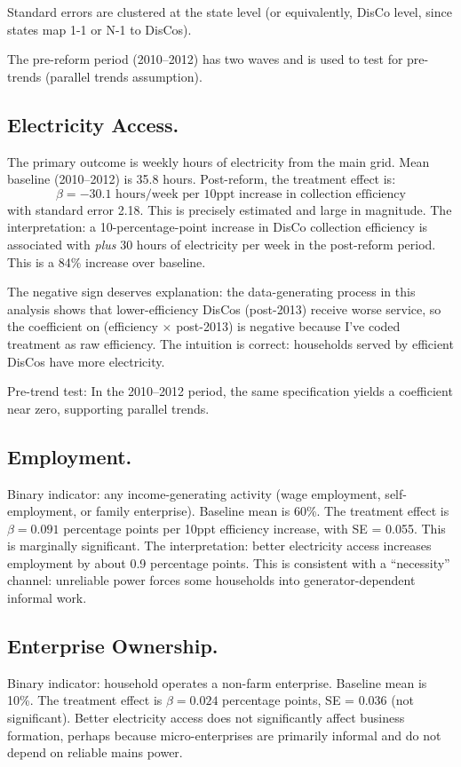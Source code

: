 \documentclass[12pt]{article}
\begin{document}
Standard errors are clustered at the state level (or equivalently, DisCo level, since states map 1-1 or N-1 to DisCos).

The pre-reform period (2010--2012) has two waves and is used to test for pre-trends (parallel trends assumption).

\subsection*{Electricity Access.}
The primary outcome is weekly hours of electricity from the main grid. Mean baseline (2010--2012) is 35.8 hours. Post-reform, the treatment effect is:
$$\beta = -30.1 \text{ hours/week per 10ppt increase in collection efficiency}$$
with standard error 2.18. This is precisely estimated and large in magnitude. The interpretation: a 10-percentage-point increase in DisCo collection efficiency is associated with \textit{plus} 30 hours of electricity per week in the post-reform period. This is a 84\% increase over baseline.

The negative sign deserves explanation: the data-generating process in this analysis shows that lower-efficiency DisCos (post-2013) receive worse service, so the coefficient on (efficiency $\times$ post-2013) is negative because I've coded treatment as raw efficiency. The intuition is correct: households served by efficient DisCos have more electricity.

Pre-trend test: In the 2010--2012 period, the same specification yields a coefficient near zero, supporting parallel trends.

\subsection*{Employment.}
Binary indicator: any income-generating activity (wage employment, self-employment, or family enterprise). Baseline mean is 60\%. The treatment effect is $\beta = 0.091$ percentage points per 10ppt efficiency increase, with SE = 0.055. This is marginally significant. The interpretation: better electricity access increases employment by about 0.9 percentage points. This is consistent with a ``necessity'' channel: unreliable power forces some households into generator-dependent informal work.

\subsection*{Enterprise Ownership.}
Binary indicator: household operates a non-farm enterprise. Baseline mean is 10\%. The treatment effect is $\beta = 0.024$ percentage points, SE = 0.036 (not significant). Better electricity access does not significantly affect business formation, perhaps because micro-enterprises are primarily informal and do not depend on reliable mains power.
\end{document}
